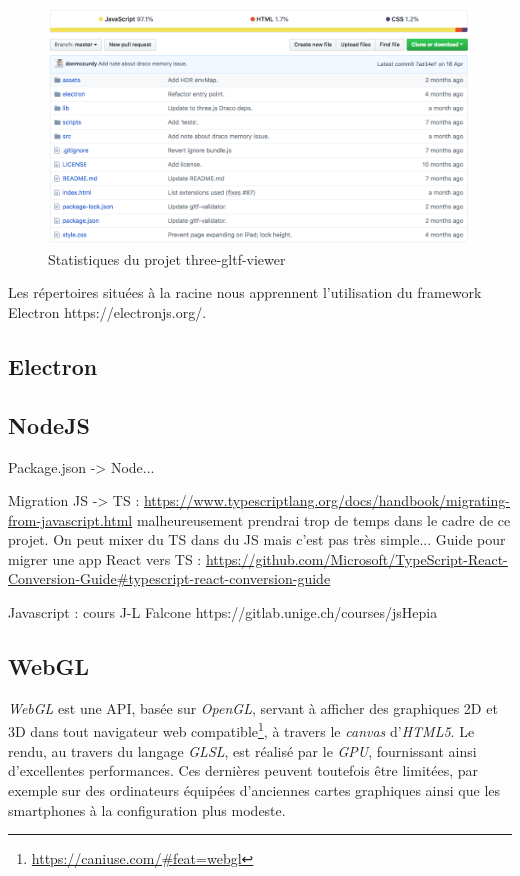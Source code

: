 \begin{figure}[h]
    \centering
    \includegraphics[width=\linewidth]{Figures/three-gltf-viewer-github-preview.png}
    \caption{Statistiques du projet three-gltf-viewer}
    \label{fig:three-gltf-viewer-github-preview}
\end{figure}

Les répertoires situées à la racine nous apprennent l'utilisation du framework Electron https://electronjs.org/.
\subsection{Electron}

\subsection{NodeJS}
Package.json -> Node...

Migration JS -> TS : \url{https://www.typescriptlang.org/docs/handbook/migrating-from-javascript.html}
malheureusement prendrai trop de temps dans le cadre de ce projet. On peut mixer du TS dans du JS mais c'est pas très simple...
Guide pour migrer une app React vers TS : \url{https://github.com/Microsoft/TypeScript-React-Conversion-Guide\#typescript-react-conversion-guide}

Javascript : cours J-L Falcone https://gitlab.unige.ch/courses/jsHepia

\subsection{WebGL}
\textit{WebGL} est une API, basée sur \textit{OpenGL}, servant à afficher des graphiques 2D et 3D dans tout navigateur web compatible\footnote{\url{https://caniuse.com/\#feat=webgl}}, à travers le \textit{canvas} d'\textit{HTML5}. 
Le rendu, au travers du langage \textit{GLSL}, est réalisé par le \textit{GPU}, fournissant ainsi d'excellentes performances. Ces dernières peuvent toutefois être limitées, par exemple sur des ordinateurs équipées d'anciennes cartes graphiques ainsi que les smartphones à la configuration plus modeste.

